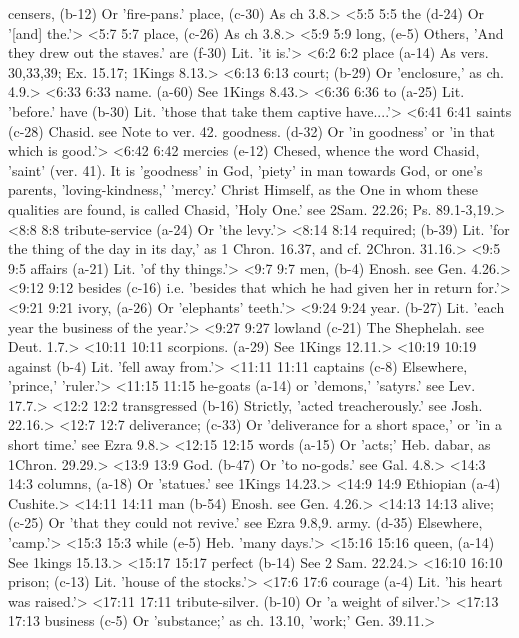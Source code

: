   censers, (b-12)  Or 'fire-pans.'
  place, (c-30) As ch 3.8.>
<5:5 5:5  the (d-24)  Or '[and] the.'>
<5:7 5:7  place, (c-26)  As ch 3.8.>
<5:9 5:9  long, (e-5)  Others, 'And they drew out the staves.'
  are (f-30)  Lit. 'it is.'>
<6:2 6:2  place (a-14)  As vers. 30,33,39; Ex. 15.17; 1Kings 8.13.>
<6:13 6:13  court; (b-29)  Or 'enclosure,' as ch. 4.9.>
<6:33 6:33  name. (a-60)  See 1Kings 8.43.>
<6:36 6:36  to (a-25)  Lit. 'before.'
  have (b-30)  Lit. 'those that take them captive have....'>
<6:41 6:41  saints (c-28)  Chasid. see Note to ver. 42.
  goodness. (d-32)  Or 'in goodness' or 'in that which is good.'>
<6:42 6:42  mercies (e-12)  Chesed, whence the word Chasid, 'saint' (ver. 41). It is  'goodness' in God, 'piety' in man towards God, or one's  parents, 'loving-kindness,' 'mercy.' Christ Himself, as the One  in whom these qualities are found, is called Chasid, 'Holy  One.' see 2Sam. 22.26; Ps. 89.1-3,19.>
<8:8 8:8  tribute-service (a-24)  Or 'the levy.'>
<8:14 8:14  required; (b-39)  Lit. 'for the thing of the day in its day,' as 1 Chron.  16.37, and cf. 2Chron. 31.16.>
<9:5 9:5  affairs (a-21)  Lit. 'of thy things.'>
<9:7 9:7  men, (b-4)  Enosh. see Gen. 4.26.>
<9:12 9:12  besides (c-16)  i.e. 'besides that which he had given her in return for.'>
<9:21 9:21  ivory, (a-26)  Or 'elephants' teeth.'>
<9:24 9:24  year. (b-27)  Lit. 'each year the business of the year.'>
<9:27 9:27  lowland (c-21)  The Shephelah. see Deut. 1.7.>
<10:11 10:11  scorpions. (a-29)  See 1Kings 12.11.>
<10:19 10:19  against (b-4)  Lit. 'fell away from.'>
<11:11 11:11  captains (c-8)  Elsewhere, 'prince,' 'ruler.'>
<11:15 11:15  he-goats (a-14)  or 'demons,' 'satyrs.' see Lev. 17.7.>
<12:2 12:2  transgressed (b-16)  Strictly, 'acted treacherously.' see Josh. 22.16.>
<12:7 12:7  deliverance; (c-33)  Or 'deliverance for a short space,' or 'in a short time.' see  Ezra 9.8.>
<12:15 12:15  words (a-15)  Or 'acts;' Heb. dabar, as 1Chron. 29.29.>
<13:9 13:9  God. (b-47)  Or 'to no-gods.' see Gal. 4.8.>
<14:3 14:3  columns, (a-18)  Or 'statues.' see 1Kings 14.23.>
<14:9 14:9  Ethiopian (a-4)  Cushite.>
<14:11 14:11  man (b-54)  Enosh. see Gen. 4.26.>
<14:13 14:13  alive; (c-25)  Or 'that they could not revive.' see Ezra 9.8,9.
  army. (d-35)  Elsewhere, 'camp.'>
<15:3 15:3  while (e-5)  Heb. 'many days.'>
<15:16 15:16  queen, (a-14)  See 1kings 15.13.>
<15:17 15:17  perfect (b-14)  See 2 Sam. 22.24.>
<16:10 16:10  prison; (c-13)  Lit. 'house of the stocks.'>
<17:6 17:6  courage (a-4)  Lit. 'his heart was raised.'>
<17:11 17:11  tribute-silver. (b-10)  Or 'a weight of silver.'>
<17:13 17:13  business (c-5)  Or 'substance;' as ch. 13.10, 'work;' Gen. 39.11.>

